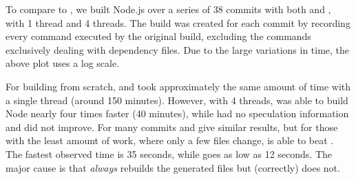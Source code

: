 


\vspace{3mm}

To compare to \Rattle, we built Node.js over a series of 38 commits with both \Make and \Rattle, with 1 thread and 4 threads. The \Rattle build was created for each commit by recording every command executed by the original build, excluding the commands exclusively dealing with dependency files. Due to the large variations in time, the above plot uses a log scale.

For building from scratch, \Make and \Rattle took approximately the same amount of time with a single thread (around 150 minutes). However, with 4 threads, \Make was able to build Node nearly four times faster (40 minutes), while \Rattle had no speculation information and did not improve. For many commits \Rattle and \Make give similar results, but for those with the least amount of work, where only a few files change, \Rattle is able to beat \Make. The fastest observed \Make time is 35 seconds, while \Rattle goes as low as 12 seconds. The major cause is that \Make \emph{always} rebuilds the generated files but \Rattle (correctly) does not.

